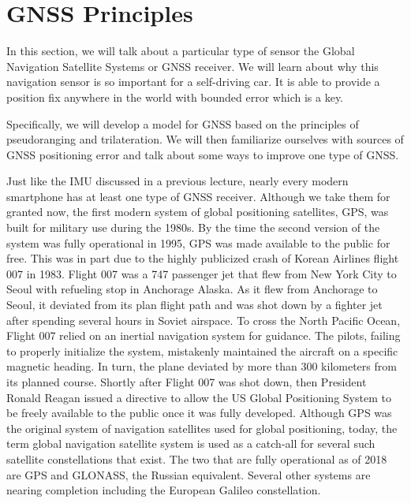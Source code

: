 \section{GNSS Principles}
\label{gnss_principles}

In this section, we will talk about
a particular type of sensor  the Global Navigation Satellite
Systems or GNSS receiver. We will learn about why
this navigation sensor is so important for a self-driving car. It is able to provide a
position fix anywhere in the world with bounded
error which is a key. 

Specifically, we will develop a model for GNSS based on the principles of
pseudoranging and trilateration. We will then familiarize ourselves
with sources of GNSS positioning error and talk about some ways
to improve one type of GNSS. 



Just like the IMU discussed in a previous lecture, nearly every modern smartphone has
at least one type of GNSS receiver. Although we take them for granted now, the first modern system of
global positioning satellites, GPS, was built for military use during the 1980s. 
By the time the second version of the system was fully operational in 1995, GPS was made available
to the public for free. This was in part due to
the highly publicized crash of Korean Airlines flight 007 in 1983. Flight 007 was a 747
passenger jet that flew from New York City to Seoul with
refueling stop in Anchorage Alaska. As it flew from Anchorage to Seoul, it deviated from its plan flight path
and was shot down by a fighter jet after spending
several hours in Soviet airspace. To cross the North Pacific Ocean, Flight 007 relied on an inertial
navigation system for guidance. The pilots, failing to properly
initialize the system, mistakenly maintained the aircraft
on a specific magnetic heading. In turn, the plane deviated by more than 300 kilometers
from its planned course. Shortly after Flight 007 was shot down, then President Ronald Reagan
issued a directive to allow the US Global Positioning System to be freely available to the public
once it was fully developed. Although GPS was the original system of navigation satellites used for
global positioning, today, the term global navigation
satellite system is used as a catch-all for several such satellite
constellations that exist. The two that are fully
operational as of 2018 are GPS and GLONASS, the Russian equivalent. Several other systems
are nearing completion including the European
Galileo constellation. 


